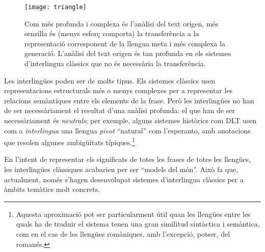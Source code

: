 \begin{figure}
\begin{center}
\texttt{[image: triangle]}
\end{center}
\caption{Com més profunda i complexa és l'anàlisi del text origen, més
  senzilla és (menys esforç comporta) la transferència a la
  representació corresponent de la llengua meta i més complexa la
  generació.  L'anàlisi del text origen és tan profunda en els
  sistemes d'interlingua clàssics que no és necessària la
  transferència.}
\label{fg:triangle}
\end{figure}

Les interlingües poden ser de molts tipus. Els sistemes clàssics usen
representacions estructurals més o menys complexes per a representar
les relacions semàntiques entre els elements de la frase. 
Però les interlingües no han de ser necessàriament el resultat d'una
anàlisi profunda: el que han de ser necessàriament és \emph{neutrals};
per exemple, alguns sistemes històrics com DLT
\citep[cap.~17]{hutchins92b} usen com a \emph{interlingua} una llengua
\emph{pivot} ``natural'' com l'esperanto, amb anotacions que resolen
algunes ambigüitats típiques.\footnote{Aquesta aproximació pot ser
  particularment útil quan les llengües entre les quals ha de traduir
  el sistema tenen una gran similitud sintàctica i semàntica, com en
  el cas de les llengües romàniques, amb l'excepció, potser, del
  romanés.}

En l'intent de representar els significats de totes les frases de
totes les llengües, les interlingües clàssiques acabarien per ser
``models del món''. Això fa que, actualment, només s'hagen
desenvolupat sistemes d'interlingua clàssics per a àmbits temàtics
molt concrets.


